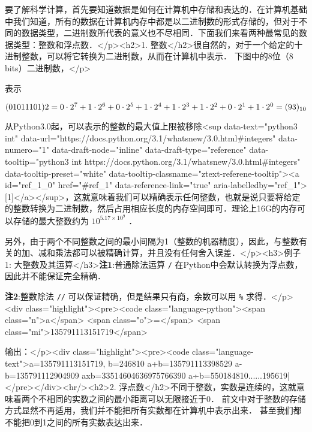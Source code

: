

要了解科学计算，首先要知道数据是如何在计算机中存储和表达的．在计算机基础中我们知道，所有的数据在计算机内存中都是以二进制数的形式存储的，但对于不同的数据类型，二进制数所代表的意义也不尽相同．下面我们来看两种最常见的数据类型：整数和浮点数．</p><h2>1. 整数</h2>很自然的，对于一个给定的十进制整数，可以将它转换为二进制数，从而在计算机中表示． 下图中的8位（8 bits）二进制数，</p>

表示

 $(01011101)2=0\cdot2^7+1\cdot2^6+0\cdot2^5+1\cdot2^4+1\cdot2^3+1\cdot2^2+0\cdot2^1+1\cdot2^0=(93)_{10}\\$  

从Python3.0起，可以表示的整数的最大值上限被移除<sup data-text="python3 int" data-url="https://docs.python.org/3.1/whatsnew/3.0.html#integers" data-numero="1" data-draft-node="inline" data-draft-type="reference" data-tooltip="python3 int https://docs.python.org/3.1/whatsnew/3.0.html#integers" data-tooltip-preset="white" data-tooltip-classname="ztext-referene-tooltip"><a id="ref_1_0" href="#ref_1" data-reference-link="true" aria-labelledby="ref_1">[1]</a></sup>，这就意味着我们可以精确表示任何整数，也就是说只要将给定的整数转换为二进制数，然后占用相应长度的内存空间即可．理论上16G的内存可以存储的最大整数约为  $10^{5.17\times10^9}$  ．

另外，由于两个不同整数之间的最小间隔为1（整数的机器精度），因此，与整数有关的加、减和乘法都可以被精确计算，并且没有任何舍入误差．</p><h3>例子1: 大整数及其运算</h3>\textbf{注1}:普通除法运算  \verb|/|  在Python中会默认转换为浮点数，因此并不能保证完全精确．

\textbf{注2}:整数除法 \verb|//| 可以保证精确，但是结果只有商，余数可以用 \verb|%|  求得．</p><div class="highlight"><pre><code class="language-python"><span class="n">a</span> <span class="o">=</span> <span class="mi">135791113151719</span>


输出：</p><div class="highlight"><pre><code class="language-text">a=135791113151719, b=246810 
a+b=135791113398529 
a-b=135791112904909 
axb=33514604636975766390 
a÷b=550184810......195619| </pre></div><hr/><h2>2. 浮点数</h2>不同于整数，实数是连续的，这就意味着两个不相同的实数之间的最小距离可以无限接近于0． 前文中对于整数的存储方式显然不再适用，我们并不能把所有实数都在计算机中表示出来． 甚至我们都不能把0到1之间的所有实数表达出来．

